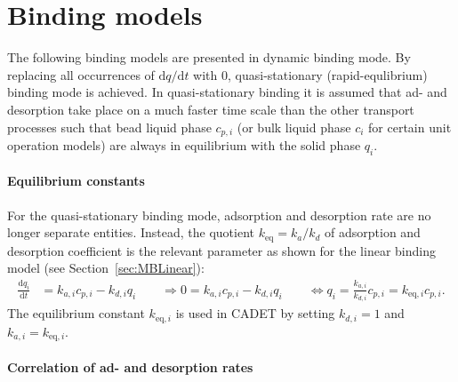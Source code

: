 %  
%  

\section{Binding models}

The following binding models  are presented in dynamic binding mode.
By replacing all occurrences of $\mathrm{d}q / \mathrm{d}t$ with $0$, quasi-stationary (rapid-equlibrium) binding mode is achieved. 
In quasi-stationary binding it is assumed that ad- and desorption take place on a much faster time scale than the other transport processes such that bead liquid phase $c_{p,i}$ (or bulk liquid phase $c_i$ for certain unit operation models) are always in equilibrium with the solid phase $q_i$.

\paragraph{Equilibrium constants}
\label{par:MBEquilibriumConstants}

For the quasi-stationary binding mode, adsorption and desorption rate are no longer separate entities. 
Instead, the quotient $k_{\text{eq}} = k_a / k_d$ of adsorption and desorption coefficient is the relevant parameter as shown for the linear binding model (see Section~\ref{sec:MBLinear}):
\begin{align*}
  \frac{\mathrm{d} q_i}{\mathrm{d} t} &= k_{a,i} c_{p,i} - k_{d,i} q_i \qquad \Rightarrow 0 = k_{a,i} c_{p,i} - k_{d,i} q_i \qquad \Leftrightarrow q_i = \frac{k_{a,i}}{k_{d,i}} c_{p,i} = k_{\text{eq},i} c_{p,i}.
\end{align*}
The equilibrium constant $k_{\text{eq},i}$ is used in CADET by setting $k_{d,i} = 1$ and $k_{a,i} = k_{\text{eq},i}$.

\paragraph{Correlation of ad- and desorption rates}

